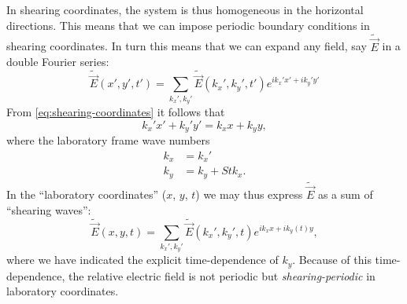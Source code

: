 \documentclass[aps,pre,notitlepage,amsmath,amssymb,amsfonts,nobibnotes,nofootinbib,superscriptaddress,onecolumn,a4paper,10pt]{revtex4-1}
\newcommand{\tvec}[1]{\tilde{\vec{#1}}}
\begin{document}
In shearing coordinates, the system is thus homogeneous in the horizontal
directions. This means that we can impose periodic boundary conditions in
shearing coordinates. In turn this means that we can expand any field, say
$\tvec{E}$ in a double Fourier series:
\begin{equation}
  \tvec{E}(x',y',t') = \sum_{k_x',k_y'}\tvec{E}(k_x',k_y',t')
  e^{ik_x' x' + ik_y' y'}
\end{equation}
From \cref{eq:shearing-coordinates} it follows that
\begin{equation}
  k_x' x' + k_y' y' = k_x x + k_y y,
\end{equation}
where the laboratory frame wave numbers
\begin{align}
  k_x &= k_x' \\
  k_y &= k_y + Stk_x.
\end{align}
In the ``laboratory coordinates'' ($x$, $y$, $t$) we may thus express
$\tvec{E}$ as a sum of ``shearing waves'':
\begin{equation}
  \tvec{E}(x,y,t) = \sum_{k_x',k_y'}\tvec{E}(k_x',k_y',t)
  e^{ik_x x + ik_y(t) y},
\end{equation}
where we have indicated the explicit time-dependence of $k_y$. Because of this
time-dependence, the relative electric field is not periodic but
\emph{shearing-periodic} in laboratory coordinates.


\end{document}
